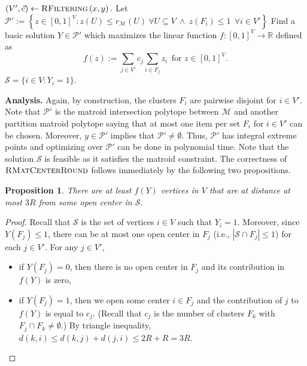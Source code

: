 \documentclass[a4paper,11pt]{article}
\newtheorem{proposition}[theorem]{Proposition}
\renewcommand{\S}{\mathcal{S}}
\newcommand{\M}{\mathcal{M}}
\renewcommand{\P}{\mathcal{P}}
\begin{document}
\begin{algorithm}[h]
\caption{$\textsc{RMatCenterRound}\left(x,y \right)$}
\begin{algorithmic}[1]
\STATE $(V',\vec{c}) \gets \textsc{RFiltering}\left(x,y \right).$
\STATE Let $\P' := \left\{z \in [0,1]^V: z(U) \leq r_\M(U) ~\forall U \subseteq V ~\wedge~ z(F_i) \leq 1 ~~\forall i \in V' \right\}$
\STATE Find a basic solution $Y \in \P'$ which maximizes the linear function $f: [0,1]^V \to \mathbb{R}$ defined as
	$$ f(z) := \sum_{j \in V'} c_j \sum_{i \in F_j} z_i ~~\text{for }z \in [0,1]^V.$$
\RETURN $\S = \{i \in V: Y_i = 1\}$.
\end{algorithmic} 
\label{algo:rmcenter}
\end{algorithm}

\bigskip \noindent \textbf{Analysis.} Again, by construction, the clusters $F_i$ are pairwise disjoint for $i \in V'$. Note that $\P'$ is the matroid intersection polytope between $\M$ and another partition matroid polytope saying that at most one item per set $F_i$ for $i \in V'$ can be chosen. Moreover, $y \in \P'$ implies that $\P' \neq \emptyset$. Thus, $\P'$ has integral extreme points and optimizing over $\P'$ can be done in polynomial time. Note that the solution $\S$ is feasible as it satisfies the matroid constraint. The correctness of $\textsc{RMatCenterRound}$ follows immediately by the following two propositions. 

\begin{proposition} There are at least $f(Y)$ vertices in $V$ that are at distance at most $3R$ from some open center in $\S$.
\label{prop:fbound}
\end{proposition}
\begin{proof} Recall that $\S$ is the set of vertices $i \in V$ such that $Y_i = 1$. Moreover, since $Y(F_j) \leq 1$, there can be at most one open center in $F_j$ (i.e., $|\S \cap F_j| \leq 1$) for each $j \in V'$. For any $j \in V'$,
\begin{itemize}
	\item if $Y(F_j) = 0$, then there is no open center in $F_j$ and its contribution in $f(Y)$ is zero,
	\item if $Y(F_j) = 1$, then we open some center $i \in F_j$ and the contribution of $j$ to $f(Y)$ is equal to $c_j$. (Recall that $c_j$ is the number of clusters $F_k$ with $F_j \cap F_k \neq \emptyset$.) By triangle inequality, $d(k,i) \leq d(k,j) + d(j,i) \leq 2R+R = 3R$.
\end{itemize}
\end{proof}
\end{document}
